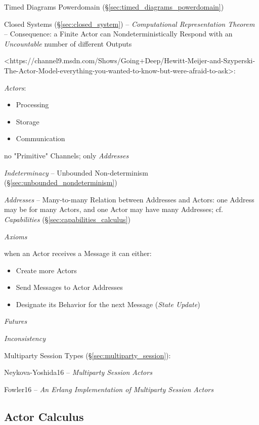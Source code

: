 Timed Diagrams Powerdomain (\S\ref{sec:timed_diagrams_powerdomain})

Closed Systems (\S\ref{sec:closed_system}) -- \emph{Computational
  Representation Theorem} -- Consequence: a Finite Actor can
Nondeterministically Respond with an \emph{Uncountable} number of
different Outputs %

<https://channel9.msdn.com/Shows/Going+Deep/Hewitt-Meijer-and-Szyperski-The-Actor-Model-everything-you-wanted-to-know-but-were-afraid-to-ask>:

\emph{Actors}:

\begin{itemize}
\item Processing
\item Storage
\item Communication
\end{itemize}

no "Primitive" Channels; only \emph{Addresses}

\emph{Indeterminacy} -- Unbounded Non-determinism
(\S\ref{sec:unbounded_nondeterminism})

\emph{Addresses} -- Many-to-many Relation between Addresses and
Actors: one Address may be for many Actors, and one Actor may have
many Addresses; cf. \emph{Capabilities}
(\S\ref{sec:capabilities_calculus})

\emph{Axioms} %

when an Actor receives a Message it can either:
\begin{itemize}
\item Create more Actors
\item Send Messages to Actor Addresses
\item Designate its Behavior for the next Message (\emph{State Update})
\end{itemize}


\emph{Futures}

\emph{Inconsistency}


\asterism


Multiparty Session Types (\S\ref{sec:multiparty_session}):

Neykova-Yoshida16 -- \emph{Multiparty Session Actors}

Fowler16 -- \emph{An Erlang Implementation of Multiparty Session
  Actors}



\subsection{Actor Calculus}\label{sec:actor_calculus}

